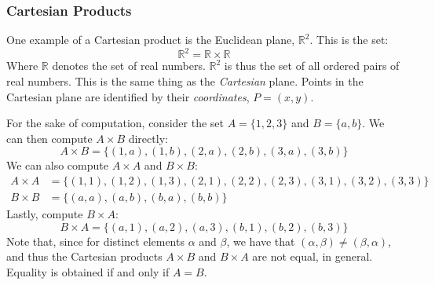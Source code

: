             \subsubsection{Cartesian Products}
                \begin{lexample}
                    One example of a Cartesian product
                    is the Euclidean plane, $\mathbb{R}^{2}$. This is
                    the set:
                    \begin{equation}
                        \mathbb{R}^{2}=\mathbb{R}\times\mathbb{R}
                    \end{equation}
                    Where $\mathbb{R}$ denotes the set of real numbers.
                    $\mathbb{R}^{2}$ is thus the set of all ordered
                    pairs of real numbers. This is the same thing as
                    the \textit{Cartesian} plane. Points
                    in the Cartesian plane are identified by their
                    \textit{coordinates}, $P=(x,y)$.
                \end{lexample}
                \begin{lexample}
                    \label{ex:Cartesian_Product}%
                    For the sake of computation, consider the
                    set $A=\{1,2,3\}$ and $B=\{a,b\}$. We can then
                    compute $A\times{B}$ directly:
                    \begin{equation}
                        A\times{B}=\big\{(1,a),(1,b),(2,a),(2,b),
                            (3,a),(3,b)\big\}
                    \end{equation}
                    We can also compute $A\times{A}$ and $B\times{B}$:
                    \begin{subequations}
                        \begin{align}
                            A\times{A}&=\big\{
                                (1,1),(1,2),(1,3),
                                (2,1),(2,2),(2,3),
                                (3,1),(3,2),(3,3)\big\}\\
                            B\times{B}&=\big\{
                                (a,a),(a,b),(b,a),(b,b)\big\}
                        \end{align}
                    \end{subequations}
                    Lastly, compute $B\times{A}$:
                    \begin{equation}
                        B\times{A}=\big\{
                            (a,1),(a,2),(a,3),
                            (b,1),(b,2),(b,3)\big\}
                    \end{equation}
                    Note that, since for distinct elements $\alpha$
                    and $\beta$, we have that
                    $(\alpha,\beta)\ne(\beta,\alpha)$, and thus
                    the Cartesian products $A\times{B}$ and $B\times{A}$
                    are not equal, in general. Equality is obtained
                    if and only if $A=B$.
                \end{lexample}
